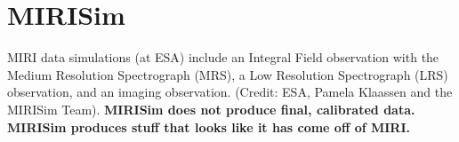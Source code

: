 \iffalse
\section*{ERS ERQ Science Enabling Products}
{\tt mrs\_analyzer} is  a Python module for analyzing MRS data; \\
{\tt mrsfringe} is a Python module for mitigating MRS fringing issues; \

\smallskip \smallskip
\noindent
And will integrate with...\\
\href{https://github.com/STScI-JWST}{\tt https://github.com/STScI-JWST} \\
see e.g. \\
{\tt https://github.com/STScI-JWST/jwst/blob/master/jwst/mrs\_imatch/mrs\_imatch\_step.py}\\
\fi

\section*{MIRISim}
MIRI data simulations (at ESA) include an Integral Field observation
with the Medium Resolution Spectrograph (MRS), a Low Resolution
Spectrograph (LRS) observation, and an imaging observation. (Credit:
ESA, Pamela Klaassen and the MIRISim Team).
{\bf MIRISim does not produce final, calibrated data. 
MIRISim produces stuff that looks like it has come off of MIRI.}



\iffalse
\section{Useful links}
http://astroconda.readthedocs.io/en/latest/ \\
https://www.cosmos.esa.int/web/jwst/simulations\\
https://confluence.stsci.edu/display/JWSTDADF/JWST+Data+Analysis+Development+Forum\\
https://jwst.stsci.edu/science-planning/data-analysis-toolbox\\
https://www.youtube.com/watch?v=A024z9CITZs\\
https://jwst.stsci.edu/science-planning/proposal-planning-toolbox/simulated-data\\
\fi


